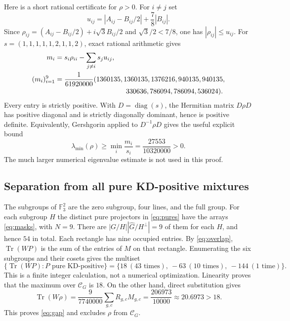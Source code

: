 \documentclass[11pt,a4paper]{article}
\theoremstyle{definition}
\theoremstyle{plain}
\DeclareMathOperator{\Tr}{Tr}
\newcommand{\F}{\mathbb F}
\newcommand{\hull}{\mathcal C}
\begin{document}
Here is a short rational certificate for $\rho>0$. For $i\ne j$ set
\[
 u_{ij}=|A_{ij}-B_{ij}/2|+\frac78|B_{ij}|.
\]
Since $\rho_{ij}=(A_{ij}-B_{ij}/2)+i\sqrt3 B_{ij}/2$ and
$\sqrt3/2<7/8$, one has $|\rho_{ij}|\leq u_{ij}$.
For $s=(1,1,1,1,1,2,1,1,2)$, exact rational arithmetic gives
\begin{equation}\label{eq:margins}
\begin{split}
 m_i&=s_i\rho_{ii}-\sum_{j\ne i}s_j u_{ij},\\
 (m_i)_{i=1}^9&=\frac1{61920000}
 (1360135,1360135,1376216,940135,940135,\\[-2pt]
 &\hspace{36mm}330636,786094,786094,536024).
\end{split}
\end{equation}
Every entry is strictly positive. With $D=\operatorname{diag}(s)$, the
Hermitian matrix $D\rho D$ has positive diagonal and is strictly diagonally
dominant, hence is positive definite. Equivalently, Gershgorin applied to
$D^{-1}\rho D$ gives the useful explicit bound
\begin{equation}\label{eq:eiglower}
 \lambda_{\min}(\rho)\geq\min_i\frac{m_i}{s_i}
 =\frac{27553}{10320000}>0.
\end{equation}
The much larger numerical eigenvalue estimate is not used in this proof.

\subsection{Separation from all pure KD-positive mixtures}
The subgroups of $\F_3^2$ are the zero subgroup, four lines, and the full
group. For each subgroup $H$ the distinct pure projectors in
\eqref{eq:pures} have the arrays \eqref{eq:masks}, with $N=9$.
There are $|G/H||\widehat G/H^\perp|=9$ of them for each $H$,
and hence $54$ in total. Each rectangle has nine occupied entries.
By \eqref{eq:overlap}, $\Tr(WP)$ is the sum of the entries of $M$ on
that rectangle. Enumerating the six subgroups and their cosets gives the
multiset
\begin{equation}\label{eq:scores}
 \{\Tr(WP):P\text{ pure KD-positive}\}
 =\{18\ (43\text{ times}),\ -63\ (10\text{ times}),\ -144\ (1\text{ time})\}.
\end{equation}
This is a finite integer calculation, not a numerical optimization.
Linearity proves that the maximum over $\hull_G$ is $18$.
On the other hand, direct substitution gives
\[
 \Tr(W\rho)=\frac9{7740000}\sum_{g,c}R_{g,c}M_{g,c}
 =\frac{206973}{10000}\approx20.6973>18.
\]
This proves \eqref{eq:gap} and excludes $\rho$ from $\hull_G$.
\end{document}
